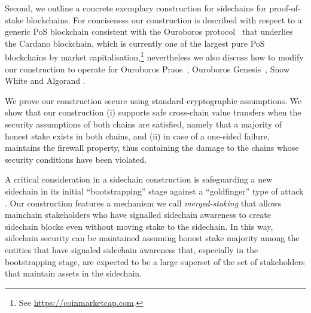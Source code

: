 Second, we  outline a concrete exemplary
construction for sidechains for proof-of-stake
blockchains. For conciseness our construction is described
with respect to a generic PoS blockchain consistent with the  Ouroboros
protocol~\cite{ouroboros} that underlies the Cardano blockchain, which is currently one of the largest
pure PoS blockchains by market capitalisation,\footnote{See \url{https://coinmarketcap.com}. }
nevertheless we also discuss how to modify our construction to
operate for
Ouroboros Praos~\cite{praos},
Ouroboros Genesis~\cite{genesis},
Snow White \cite{snowwhite}
and
Algorand \cite{algorand}.

We prove our construction secure   using standard cryptographic
assumptions. We show that our construction (i) supports safe cross-chain value
transfers when the security assumptions of both chains are satisfied, namely
that a majority of honest stake exists in both chains, and (ii) in case of a
one-sided failure,  maintains the firewall property, thus
containing the damage
to the chains whose security conditions have been violated.
%

A critical consideration in a sidechain construction is safeguarding
a new sidechain in its initial ``bootstrapping'' stage against a ``goldfinger'' type of attack \cite{mining-economics,hostile}. Our construction
features a mechanism we call {\em merged-staking}
that allows  mainchain stakeholders who have signalled
sidechain awareness to create sidechain blocks even without moving stake
to the sidechain. In this way, sidechain security can be maintained
assuming honest stake majority among the entities that have signaled sidechain
awareness that, especially in the bootstrapping stage, are expected to be
a large superset of the set of stakeholders that maintain assets
in the sidechain.

